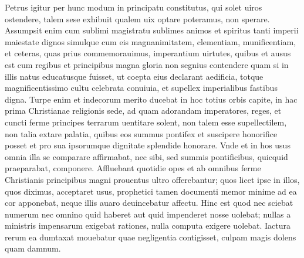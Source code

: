 \documentclass[a5paper,twoside]{article}
\begin{document}
Petrus igitur per hunc modum in principatu constitutus, qui solet uiros ostendere, talem sese exhibuit qualem uix optare poteramus, non sperare. Assumpsit enim cum sublimi magistratu sublimes animos et spiritus tanti imperii maiestate dignos simulque cum eis magnanimitatem, clementiam, munificentiam, et ceteras, quas prius commemorauimus, imperantium uirtutes, quibus et ausus est cum regibus et principibus magna gloria non segnius contendere quam si in illis natus educatusque fuisset, ut coepta eius declarant aedificia, totque magnificentissimo cultu celebrata conuiuia, et supellex imperialibus fastibus digna. Turpe enim et indecorum merito ducebat in hoc totius orbis capite, in hac prima Christianae religionis sede, ad quam adorandam imperatores, reges, et cuncti ferme principes terrarum uentitare solent, non talem esse supellectilem, non talia extare palatia, quibus eos summus pontifex et suscipere honorifice posset et pro sua ipsorumque dignitate splendide honorare. Vnde et in hos usus omnia illa se comparare affirmabat, nec sibi, sed summis pontificibus, quicquid praeparabat, componere. Affluebant quotidie opes et ab omnibus ferme Christianis principibus magni prouentus ultro offerebantur; quos licet ipse in illos, quos diximus, acceptaret usus, prophetici tamen documenti memor minime ad ea cor apponebat, neque illis auaro deuincebatur affectu. Hinc est quod nec sciebat numerum nec omnino quid haberet aut quid impenderet nosse uolebat; nullas a ministris impensarum exigebat rationes, nulla computa exigere uolebat. Iactura rerum ea dumtaxat mouebatur quae negligentia contigisset, culpam magis dolens quam damnum. 
\end{document}
